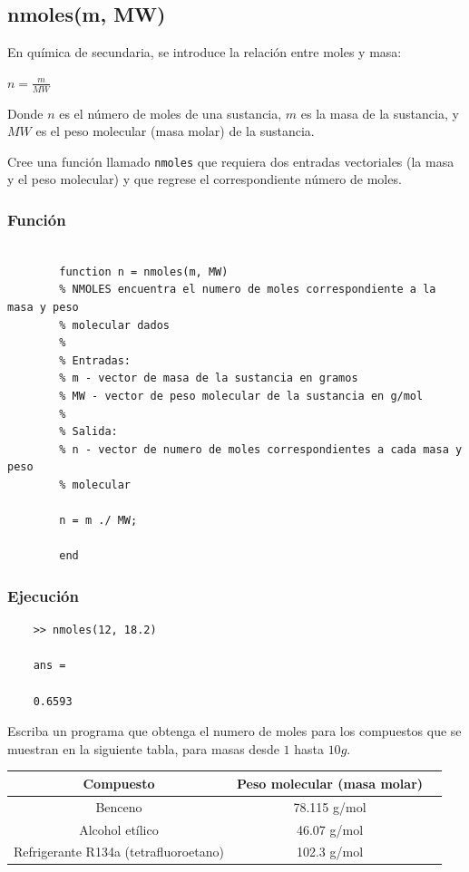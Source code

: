 \documentclass{article}
\begin{document}
	\subsection{nmoles(m, MW)}
	
	En química de secundaria, se introduce la relación entre moles y masa:
	
	$n = \frac{m}{MW}$
	
	Donde
	$n$ es el número de moles de una sustancia,
	$m$ es la masa de la sustancia, y
	$MW$ es el peso molecular (masa molar) de la sustancia.
	
	Cree una función llamado \texttt{nmoles} que requiera dos entradas vectoriales (la masa y el peso molecular) y que regrese el correspondiente número de moles.
	
	\subsubsection{Función}
	
	\begin{lstlisting}
		
		function n = nmoles(m, MW)
		% NMOLES encuentra el numero de moles correspondiente a la masa y peso 
		% molecular dados
		%
		% Entradas:
		% m - vector de masa de la sustancia en gramos
		% MW - vector de peso molecular de la sustancia en g/mol
		%
		% Salida:
		% n - vector de numero de moles correspondientes a cada masa y peso 
		% molecular
		
		n = m ./ MW;
		
		end
	\end{lstlisting}
	
	\subsubsection{Ejecución}
	
	\begin{lstlisting}
	>> nmoles(12, 18.2)
	
	ans =
	
	0.6593
	\end{lstlisting}
	
	Escriba un programa que obtenga el numero de moles para los compuestos que se muestran en la siguiente tabla, para masas desde $1$ hasta $10 g$.
	\newline
	\begin{center}
		\begin{tabular}{|c|c|c|}
			\hline
			\textbf{Compuesto} & \textbf{Peso molecular (masa molar)} \\
			\hline
			Benceno & 78.115 g/mol \\
			\hline
			Alcohol etílico & 46.07 g/mol \\
			\hline
			Refrigerante R134a (tetrafluoroetano) & 102.3 g/mol \\
			\hline
		\end{tabular}
	\end{center}
	
\end{document}

